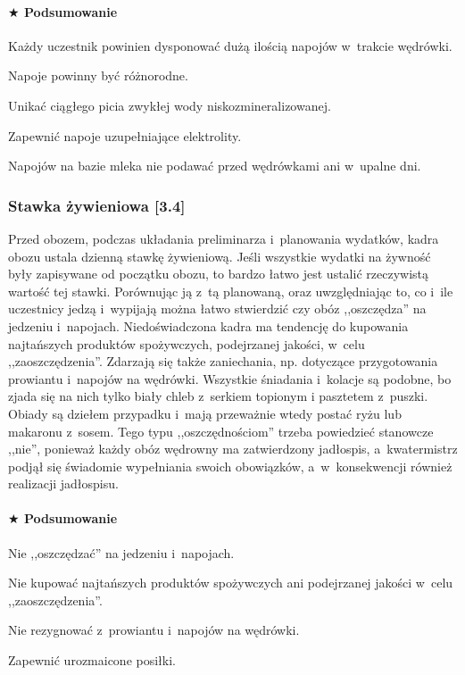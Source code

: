 \documentclass[a5paper,10pt,titlepage,twoside]{article}
\newcommand*{\thecheckbox}{\hss$\Box$} %
\newenvironment*{checklist}
{\list{}{%
\renewcommand*{\makelabel}[1]{\thecheckbox}}}
{\endlist}
\begin{document}
\paragraph{$\bigstar$ Podsumowanie}
\begin{checklist}
\item Każdy uczestnik powinien dysponować dużą ilością napojów w~trakcie wędrówki.
\item Napoje powinny być różnorodne.
\item Unikać ciągłego picia zwykłej wody niskozmineralizowanej.
\item Zapewnić napoje uzupełniające elektrolity.
\item Napojów na bazie mleka nie podawać przed wędrówkami ani w~upalne dni.
\end{checklist}
\subsubsection{Stawka żywieniowa [3.4]}
Przed obozem, podczas układania preliminarza i~planowania wydatków, kadra obozu ustala dzienną stawkę żywieniową. Jeśli wszystkie wydatki na żywność były zapisywane od początku obozu, to bardzo łatwo jest ustalić rzeczywistą wartość tej stawki. Porównując ją z~tą planowaną, oraz uwzględniając to, co i~ile uczestnicy jedzą i~wypijają można łatwo stwierdzić czy obóz ,,oszczędza'' na jedzeniu i~napojach. Niedoświadczona kadra ma tendencję do kupowania najtańszych produktów spożywczych, podejrzanej jakości, w~celu ,,zaoszczędzenia''. Zdarzają się także zaniechania, np. dotyczące przygotowania prowiantu i~napojów na wędrówki. Wszystkie śniadania i~kolacje są podobne, bo zjada się na nich tylko biały chleb z~serkiem topionym i pasztetem z~puszki. Obiady są dziełem przypadku i~mają przeważnie wtedy postać ryżu lub makaronu z~sosem. Tego typu ,,oszczędnościom'' trzeba powiedzieć stanowcze ,,nie'', ponieważ każdy obóz wędrowny ma zatwierdzony jadłospis, a~kwatermistrz podjął się świadomie wypełniania swoich obowiązków, a~w~konsekwencji również realizacji jadłospisu.
\paragraph{$\bigstar$ Podsumowanie}
\begin{checklist}
\item Nie ,,oszczędzać'' na jedzeniu i~napojach.
\item Nie kupować najtańszych produktów spożywczych ani podejrzanej jakości w~celu ,,zaoszczędzenia''.
\item Nie rezygnować z~prowiantu i~napojów na wędrówki.
\item Zapewnić urozmaicone posiłki.
\end{checklist}
\end{document}
